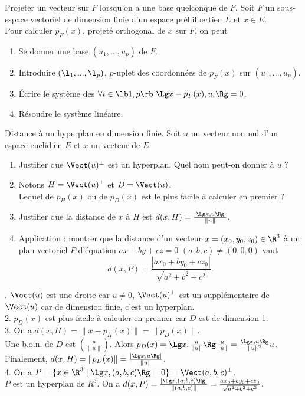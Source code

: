 \documentclass[11pt]{article}
\begin{document}
\begin{meth}{Projeter un vecteur sur $F$ lorsqu'on a une base quelconque de $F$.}{}
    Soit $F$ un sous-espace vectoriel de dimension finie d'un espace préhilbertien $E$ et $x\in E$.\\
    Pour calculer $p_F(x)$, projeté orthogonal de $x$ sur $F$, on peut
    \begin{enumerate}[topsep=0pt,itemsep=-0.9ex]
        \item Se donner une base $(u_1,...,u_p)$ de $F$.
        \item Introduire $(\l_1,...,\l_p)$, $p$-uplet des coordonnées de $p_F(x)$ sur $(u_1,...,u_p)$.
        \item Écrire le système des $\forall i\in\lb1,p\rb ~ \Lg x-p_F(x), u_i \Rg = 0$.
        \item Résoudre le système linéaire.
    \end{enumerate}
\end{meth}

\begin{ex}{Distance à un hyperplan en dimension finie.}{}
    Soit $u$ un vecteur non nul d'un espace euclidien $E$ et $x$ un vecteur de $E$.
    \begin{enumerate}[topsep=0pt,itemsep=-0.5ex]
        \item Justifier que $\Vect(u)^\bot$ est un hyperplan. Quel nom peut-on donner à $u$ ?
        \item Notons $H=\Vect(u)^\bot$ et $D=\Vect(u)$.\\
        Lequel de $p_H(x)$ ou de $p_D(x)$ est le plus facile à calculer en premier ?
        \item Justifier que la distance de $x$ à $H$ est $d(x,H)=\frac{|\Lg x, u \Rg|}{\|u\|}$. 
        \item Application : montrer que la distance d'un vecteur $x=(x_0,y_0,z_0)\in\R^3$ à un plan vectoriel $P$ d'équation $ax+by+cz=0$ $(a,b,c)\neq(0,0,0)$ vaut
        \begin{equation*}
            d(x,P)=\frac{|ax_0+by_0+cz_0|}{\sqrt{a^2+b^2+c^2}}.
        \end{equation*}
    \end{enumerate}
    . $\Vect(u)$ est une droite car $u\neq 0$, $\Vect(u)^\bot$ est un supplémentaire de $\Vect(u)$ car de dimension finie, c'est un hyperplan.\\
    2. $p_D(x)$ est plus facile à calculer en premier car $D$ est de dimension 1.\\
    3. On a $d(x,H)=\|x-p_H(x)\|=\|p_D(x)\|$.\\
    Une b.o.n. de $D$ est $(\frac{u}{\|u\|})$. Alors $p_D(x)=\Lg x, \frac{u}{\|u\|}\Rg \frac{u}{\|u\|} = \frac{\Lg x, u \Rg}{\|u\|^2}u$.\\
    Finalement, $d(x,H)=\|p_D(x)\|=\frac{|\Lg x, u \Rg|}{\|u\|}$.\\
    4. On a $P=\{x\in\R^3 \mid \Lg x, (a,b,c) \Rg = 0\}=\Vect(a,b,c)^\bot$.\\
    $P$ est un hyperplan de $R^3$. On a $d(x,P)=\frac{|\Lg x, (a,b,c)\Rg|}{\|(a,b,c)\|}=\frac{ax_0+by_0+cz_0}{\sqrt{a^2+b^2+c^2}}$.
\end{ex}
\end{document}
